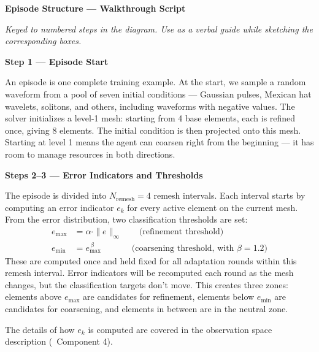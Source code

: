 \documentclass[11pt]{article}
\begin{document}
\begin{center}
{\Large\bfseries Episode Structure --- Walkthrough Script}
\end{center}

\vspace{0.15cm}
\noindent\textit{Keyed to numbered steps in the diagram. Use as a verbal guide while sketching the corresponding boxes.}

\vspace{0.5cm}

\noindent\textbf{\textcolor{episodecolor}{Step 1 --- Episode Start}}

An episode is one complete training example. At the start, we sample a random waveform from a pool of seven initial conditions --- Gaussian pulses, Mexican hat wavelets, solitons, and others, including waveforms with negative values. The solver initializes a level-1 mesh: starting from 4 base elements, each is refined once, giving 8 elements. The initial condition is then projected onto this mesh. Starting at level 1 means the agent can coarsen right from the beginning --- it has room to manage resources in both directions.

\vspace{0.4cm}

\noindent\textbf{\textcolor{intervalcolor}{Steps 2--3 --- Error Indicators and Thresholds}}

The episode is divided into $N_{\text{remesh}} = 4$ remesh intervals. Each interval starts by computing an error indicator $e_k$ for every active element on the current mesh. From the error distribution, two classification thresholds are set:
%
\begin{align*}
e_{\max} &= \alpha \cdot \|e\|_\infty \qquad \text{(refinement threshold)} \\
e_{\min} &= e_{\max}^{\,\beta} \qquad\quad\;\; \text{(coarsening threshold, with } \beta = 1.2 \text{)}
\end{align*}
%
These are computed once and held fixed for all adaptation rounds within this remesh interval. Error indicators will be recomputed each round as the mesh changes, but the classification targets don't move. This creates three zones: elements above $e_{\max}$ are candidates for refinement, elements below $e_{\min}$ are candidates for coarsening, and elements in between are in the neutral zone.

The details of how $e_k$ is computed are covered in the observation space description (\textrightarrow~Component 4).
\end{document}
